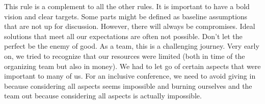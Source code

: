 \documentclass[10pt,letterpaper]{article}
\begin{document}

This rule is a complement to all the other rules. It is important to have a bold vision and clear targets. Some parts might be defined as baseline assumptions that are not up for discussion. However, there will always be compromises. Ideal solutions that meet all our expectations are often not possible. Don't let the perfect be the enemy of good. As a team, this is a challenging journey. Very early on, we tried to recognize that our resources were limited (both in time of the organizing team but also in money). We had to let go of certain aspects that were important to many of us. For an inclusive conference, we need to avoid giving in because considering all aspects seems impossible and burning ourselves and the team out because considering all aspects is actually impossible.
\end{document}
